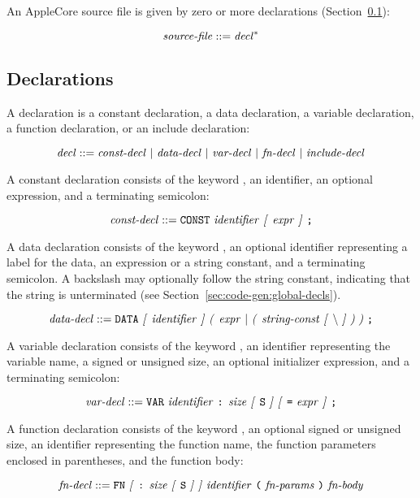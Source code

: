 \documentclass[10pt]{article}
\begin{document}
An AppleCore source file is given by zero or more
declarations (Section~\ref{sec:syntax:decls}):

$$\mbox{\textit{source-file}} ::= \mbox{\textit{decl}}^*$$

\subsection{Declarations}
\label{sec:syntax:decls}

A declaration is a constant declaration, a data declaration, a
variable declaration, a function declaration, or an include
declaration:

$$\mbox{\textit{decl}} ::= \mbox{\ensuremath{\mbox{\textit{const-decl}}} $|$
  \ensuremath{\mbox{\textit{data-decl}}} $|$ \ensuremath{\mbox{\textit{var-decl}}} $|$ \ensuremath{\mbox{\textit{fn-decl}}}
    $|$ \ensuremath{\mbox{\textit{include-decl}}}}$$

 A constant declaration consists of the
keyword , an identifier, an optional expression, and a
terminating semicolon:

$$\mbox{\textit{const-decl}} ::= \mbox{\texttt{CONST} \ensuremath{\mbox{\textit{identifier}}}
  \textit{[} \ensuremath{\mbox{\textit{expr}}} \textit{]} \texttt{;}}$$

 A data declaration consists of the keyword
, an optional identifier representing a label for the data,
an expression or a string constant, and a terminating semicolon.  A
backslash may optionally follow the string constant, indicating that
the string is unterminated (see
Section~\ref{sec:code-gen:global-decls}).

$$\nonterm{data-decl} ::= \mbox{\kwd{DATA} \opt{\nonterm{identifier}}
  \group{\nonterm{expr} $|$ \group{\nonterm{string-const} \opt{\bs}}}
  \kwd{;}}$$

 A variable declaration consists of the
keyword , an identifier representing the variable name, a
signed or unsigned size, an optional initializer expression, and a
terminating semicolon:

$$\mbox{\textit{var-decl}} ::= \mbox{\texttt{VAR} \ensuremath{\mbox{\textit{identifier}}} \texttt{:}
  \ensuremath{\mbox{\textit{size}}} \textit{[} \texttt{S} \textit{]} \textit{[} \texttt{=} \ensuremath{\mbox{\textit{expr}}} \textit{]} \texttt{;}}$$

 A function declaration consists of the
keyword , an optional signed or unsigned size, an identifier
representing the function name, the function parameters enclosed in
parentheses, and the function body:

$$\mbox{\textit{fn-decl}} ::= \mbox{\texttt{FN} \textit{[} \texttt{:} \ensuremath{\mbox{\textit{size}}}
    \textit{[} \texttt{S} \textit{]} \textit{]} \ensuremath{\mbox{\textit{identifier}}} \texttt{(} \ensuremath{\mbox{\textit{fn-params}}}
  \texttt{)} \ensuremath{\mbox{\textit{fn-body}}}}$$
\end{document}
